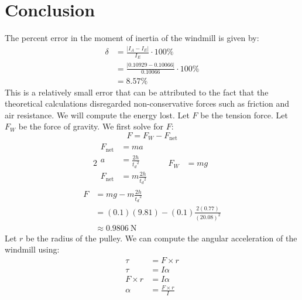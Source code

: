\documentclass[article, 11pt]{article}
\begin{document}
    \section{Conclusion}
    \noindent
    The percent error in the moment of inertia of the windmill is given by:
    \begin{align*}
        \delta &= \frac{|I_A - I_E|}{I_E} \cdot 100\% \\
               &= \frac{|0.10929 - 0.10066|}{0.10066} \cdot 100\% \\
               &= 8.57\%
    \end{align*}
    This is a relatively small error that can be attributed to the fact that the theoretical calculations disregarded non-conservative forces such as friction and air resistance. We will compute the energy lost.
    Let $F$ be the tension force. Let $F_W$ be the force of gravity. We first solve for $F$:
    \begin{equation*}
        F = F_W - F_\text{net}
    \end{equation*}
    \begin{alignat*}{2}
        \begin{aligned}
            F_\text{net} &= ma \\
                       a &= \frac{2h}{{t_d}^2} \\
            F_\text{net} &= m\frac{2h}{{t_d}^2}
        \end{aligned} & \quad
        \begin{aligned}
            F_W &= mg
        \end{aligned}
    \end{alignat*}
    \begin{align*}
        F &= mg - m\frac{2h}{{t_d}^2} \\
          &= (0.1)(9.81) - (0.1)\frac{2(0.77)}{(20.08)^2} \\
          &\approx \SI{0.9806}{\newton}
    \end{align*}
    Let $r$ be the radius of the pulley. We can compute the angular acceleration of the windmill using:
    \begin{align*}
        \tau &= F \times r \\
        \tau &= I \alpha \\
        F \times r &= I \alpha \\
        \alpha &= \frac{F \times r}{I}
    \end{align*}
\end{document}
